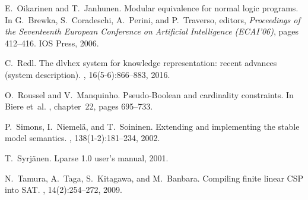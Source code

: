 \begin{thebibliography}{10}
E.~Oikarinen and T.~Janhunen.
\newblock Modular equivalence for normal logic programs.
\newblock In G.~Brewka, S.~Coradeschi, A.~Perini, and P.~Traverso, editors,
  {\em Proceedings of the Seventeenth European Conference on Artificial
  Intelligence (ECAI'06)}, pages 412--416. IOS Press, 2006.

C.~Redl.
\newblock The dlvhex system for knowledge representation: recent advances
  (system description).
, 16(5-6):866--883,
  2016.

O.~Roussel and V.~Manquinho.
\newblock Pseudo-{B}oolean and cardinality constraints.
\newblock In Biere et~al. \cite{SATHandbook}, chapter~22, pages 695--733.

P.~Simons, I.~Niemelä, and T.~Soininen.
\newblock Extending and implementing the stable model semantics.
, 138(1-2):181--234, 2002.

T.~Syrjänen.
\newblock Lparse 1.0 user's manual, 2001.

N.~Tamura, A.~Taga, S.~Kitagawa, and M.~Banbara.
\newblock Compiling finite linear {CSP} into {SAT}.
, 14(2):254--272, 2009.

\end{thebibliography}
